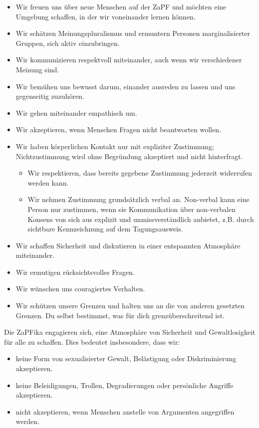\documentclass[
  a4paper,
  oneside]{scrartcl}
\providecommand{\tightlist}{%
  \setlength{\itemsep}{0pt}\setlength{\parskip}{0pt}}
\begin{document}
\begin{itemize}
\tightlist
\item
  Wir freuen uns über neue Menschen auf der ZaPF und möchten eine
  Umgebung schaffen, in der wir voneinander lernen können.
\item
  Wir schätzen Meinungspluralismus und ermuntern Personen
  marginalisierter Gruppen, sich aktiv einzubringen.
\item
  Wir kommunizieren respektvoll miteinander, auch wenn wir verschiedener
  Meinung sind.
\item
  Wir bemühen uns bewusst darum, einander ausreden zu lassen und uns
  gegenseitig zuzuhören.
\item
  Wir gehen miteinander empathisch um.
\item
  Wir akzeptieren, wenn Menschen Fragen nicht beantworten wollen.
\item
  Wir haben körperlichen Kontakt nur mit expliziter Zustimmung;
  Nichtzustimmung wird ohne Begründung akzeptiert und nicht hinterfragt.

  \begin{itemize}
  \tightlist
  \item
    Wir respektieren, dass bereits gegebene Zustimmung jederzeit
    widerrufen werden kann.
  \item
    Wir nehmen Zustimmung grundsätzlich verbal an. Non-verbal kann eine
    Person nur zustimmen, wenn sie Kommunikation über non-verbalen
    Konsens von sich aus explizit und unmissverständlich anbietet, z.B.
    durch sichtbare Kennzeichnung auf dem Tagungsausweis.
  \end{itemize}
\item
  Wir schaffen Sicherheit und diskutieren in einer entspannten
  Atmosphäre miteinander.
\item
  Wir ermutigen rücksichtsvolles Fragen.
\item
  Wir wünschen uns couragiertes Verhalten.
\item
  Wir schützen unsere Grenzen und halten uns an die von anderen
  gesetzten Grenzen. Du selbst bestimmst, was für dich
  grenzüberschreitend ist.
\end{itemize}

Die ZaPFika engagieren sich, eine Atmosphäre von Sicherheit und
Gewaltlosigkeit für alle zu schaffen. Dies bedeutet insbesondere, dass
wir:

\begin{itemize}
\tightlist
\item
  keine Form von sexualisierter Gewalt, Belästigung oder Diskriminierung
  akzeptieren.
\item
  keine Beleidigungen, Trollen, Degradierungen oder persönliche Angriffe
  akzeptieren.
\item
  nicht akzeptieren, wenn Menschen anstelle von Argumenten angegriffen
  werden.
\end{itemize}
\end{document}
